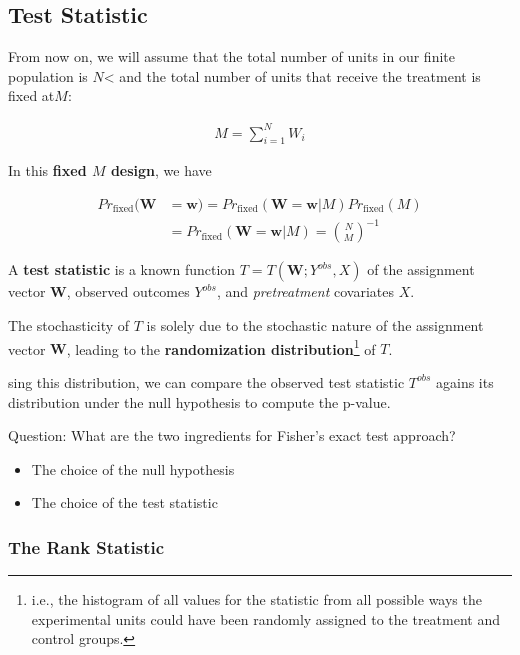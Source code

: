 \subsection{Test Statistic}

From now on, we will assume that the total number of units in our finite population is $N$< and the total number of units that receive the treatment is fixed at$M$:

\begin{align}
    M = \sum_{i=1}^N W_i
\end{align}

In this \textbf{fixed $M$ design}, we have

\begin{align}
    Pr_\text{fixed}(\mathbf{W} &= \mathbf{w}) = Pr_\text{fixed}(\mathbf{W} = \mathbf{w}| M) Pr_\text{fixed}(M)\\
    &= Pr_\text{fixed}(\mathbf{W} = \mathbf{w}| M) = \binom{N}{M}^{-1}
\end{align}

A \textbf{test statistic} is a known function $T=T(\mathbf{W}; Y^{obs}, X)$ of the assignment vector $\mathbf{W}$, observed outcomes $Y^{obs}$, and \textit{pretreatment} covariates $X$.

The stochasticity of $T$ is solely due to the stochastic nature of the assignment vector $\mathbf{W}$, leading to the \textbf{randomization distribution}\footnote{i.e., the histogram of all values for the statistic from all possible ways the experimental units could have been randomly assigned to the treatment and control groups.} of $T$.

sing this distribution, we can compare the observed test statistic $T^{obs}$ agains its distribution under the null hypothesis to compute the p-value.

\vspace{1em}

Question: What are the two ingredients for Fisher's exact test approach?

{\color{gray}
\begin{itemize}
    \item The choice of the null hypothesis
    \item The choice of the test statistic
\end{itemize}
}


\subsubsection{The Rank Statistic}

